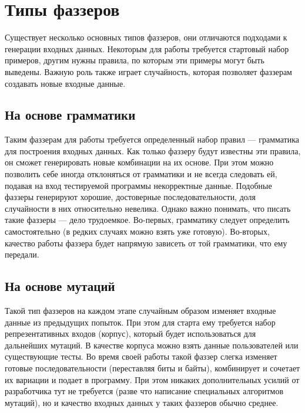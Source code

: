 \documentclass[areasetadvanced]{scrartcl}
\begin{document}
\section{Типы фаззеров}
Существует несколько основных типов фаззеров, они отличаются подходами к генерации входных
данных. Некоторым для работы требуется стартовый набор примеров, другим нужны правила, по
которым эти примеры могут быть выведены. Важную роль также играет случайность, которая
позволяет фаззерам создавать новые входные данные.
\subsection{На основе грамматики}
Таким фаззерам для работы требуется определенный набор правил — грамматика для
построения входных данных. Как только фаззеру будут известны эти правила, он сможет
генерировать новые комбинации на их основе. При этом можно позволить себе иногда
отклоняться от грамматики и не всегда следовать ей, подавая на вход тестируемой программы
некорректные данные.
Подобные фаззеры генерируют хорошие, достоверные последовательности, доля случайности в
них относительно невелика. Однако важно понимать, что писать такие фаззеры — дело
трудоемкое. Во-первых, грамматику следует определить самостоятельно (в редких случаях можно
взять уже готовую). Во-вторых, качество работы фаззера будет напрямую зависеть от той
грамматики, что ему передали.
\newpage
\subsection{На основе мутаций}
Такой тип фаззеров на каждом этапе случайным образом изменяет входные данные из
предыдущих попыток. При этом для старта ему требуется набор репрезентативных входов
(корпус), который будет использоваться для дальнейших мутаций. В качестве корпуса можно взять
данные пользователей или существующие тесты. Во время своей работы такой фаззер слегка
изменяет готовые последовательности (переставляя биты и байты), комбинирует и сочетает их
вариации и подает в программу.
При этом никаких дополнительных усилий от разработчика тут не требуется (разве что написание
специальных алгоритмов мутаций), но и качество входных данных у таких фаззеров обычно
среднее.
\newpage
\end{document}
